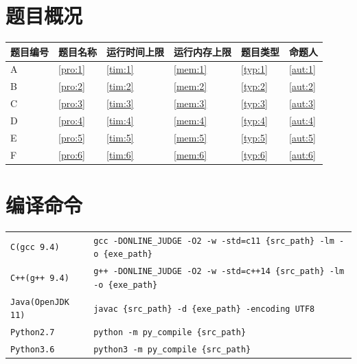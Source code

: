 \documentclass[
	lang=cn,
	color=green
]{elegantbook}
\begin{document}
\begin{titlepage}
    \section*{题目概况}
    \begin{tabularx}{450pt}{M|M|M|M|M|M}
        \toprule
        \textbf{题目编号} & \textbf{题目名称} & \textbf{运行时间上限} & \textbf{运行内存上限} & \textbf{题目类型} & \textbf{命题人} \\
        \midrule
        A                 & \ref*{pro:1}      & \ref*{tim:1}          & \ref*{mem:1}          & \ref*{typ:1}      & \ref*{aut:1}    \\
        B                 & \ref*{pro:2}      & \ref*{tim:2}          & \ref*{mem:2}          & \ref*{typ:2}      & \ref*{aut:2}    \\
        C                 & \ref*{pro:3}      & \ref*{tim:3}          & \ref*{mem:3}          & \ref*{typ:3}      & \ref*{aut:3}    \\
        D                 & \ref*{pro:4}      & \ref*{tim:4}          & \ref*{mem:4}          & \ref*{typ:4}      & \ref*{aut:4}    \\
        E                 & \ref*{pro:5}      & \ref*{tim:5}          & \ref*{mem:5}          & \ref*{typ:5}      & \ref*{aut:5}    \\
        F                 & \ref*{pro:6}      & \ref*{tim:6}          & \ref*{mem:6}          & \ref*{typ:6}      & \ref*{aut:6}    \\
        \bottomrule
    \end{tabularx}

    \section*{编译命令}
    \small
    \begin{tabularx}{450pt}{l|X}
        \toprule
        \verb|C(gcc 9.4)|  & \verb|gcc -DONLINE_JUDGE -O2 -w -std=c11 {src_path} -lm -o {exe_path}|  \\
        \verb|C++(g++ 9.4)|  & \verb|g++ -DONLINE_JUDGE -O2 -w -std=c++14 {src_path} -lm -o {exe_path}|  \\
        \verb|Java(OpenJDK 11)|  & \verb|javac {src_path} -d {exe_path} -encoding UTF8|  \\
        \verb|Python2.7|  & \verb|python -m py_compile {src_path}|  \\
        \verb|Python3.6| & \verb|python3 -m py_compile {src_path}| \\
        \bottomrule
    \end{tabularx}
    \normalsize


\end{titlepage}
\end{document}
